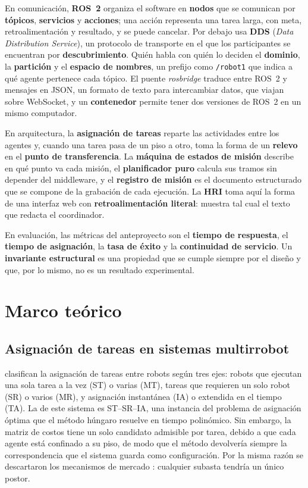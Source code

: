 En comunicación, \textbf{ROS~2} organiza el software en \textbf{nodos} que se comunican por \textbf{tópicos}, \textbf{servicios} y \textbf{acciones}; una acción representa una tarea larga, con meta, retroalimentación y resultado, y se puede cancelar. Por debajo usa \textbf{DDS} (\textit{Data Distribution Service}), un protocolo de transporte en el que los participantes se encuentran por \textbf{descubrimiento}. Quién habla con quién lo deciden el \textbf{dominio}, la \textbf{partición} y el \textbf{espacio de nombres}, un prefijo como \texttt{/robot1} que indica a qué agente pertenece cada tópico. El puente \textit{rosbridge} traduce entre ROS~2 y mensajes en JSON, un formato de texto para intercambiar datos, que viajan sobre WebSocket, y un \textbf{contenedor} permite tener dos versiones de ROS~2 en un mismo computador.

En arquitectura, la \textbf{asignación de tareas} reparte las actividades entre los agentes y, cuando una tarea pasa de un piso a otro, toma la forma de un \textbf{relevo} en el \textbf{punto de transferencia}. La \textbf{máquina de estados de misión} describe en qué punto va cada misión, el \textbf{planificador puro} calcula sus tramos sin depender del middleware, y el \textbf{registro de misión} es el documento estructurado que se compone de la grabación de cada ejecución. La \textbf{HRI} toma aquí la forma de una interfaz web con \textbf{retroalimentación literal}: muestra tal cual el texto que redacta el coordinador.

En evaluación, las métricas del anteproyecto son el \textbf{tiempo de respuesta}, el \textbf{tiempo de asignación}, la \textbf{tasa de éxito} y la \textbf{continuidad de servicio}. Un \textbf{invariante estructural} es una propiedad que se cumple siempre por el diseño y que, por lo mismo, no es un resultado experimental.

\section{Marco teórico}
\label{sec:teorico}

\subsection{Asignación de tareas en sistemas multirrobot}

\textcite{gerkey2004taxonomy} clasifican la asignación de tareas entre robots según tres ejes: robots que ejecutan una sola tarea a la vez (ST) o varias (MT), tareas que requieren un solo robot (SR) o varios (MR), y asignación instantánea (IA) o extendida en el tiempo (TA). La de este sistema es ST--SR--IA, una instancia del problema de asignación óptima que el método húngaro resuelve en tiempo polinómico. Sin embargo, la matriz de costos tiene un solo candidato admisible por tarea, debido a que cada agente está confinado a su piso, de modo que el método devolvería siempre la correspondencia que el sistema guarda como configuración. Por la misma razón se descartaron los mecanismos de mercado \autocite{quinton2023market}: cualquier subasta tendría un único postor.


